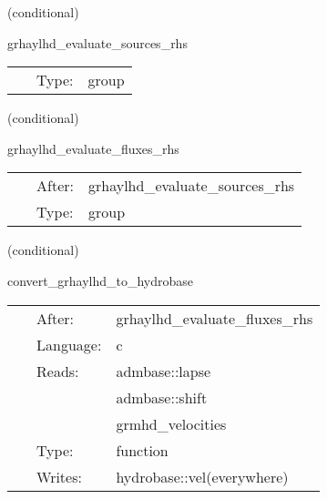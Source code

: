 \documentclass{article}
\begin{document}
\vspace{5mm}

   (conditional) 

\hspace{5mm} grhaylhd\_evaluate\_sources\_rhs 

\hspace{5mm}{\it evaluate source terms in grhd rhss } 


\hspace{5mm}

 \begin{tabular*}{160mm}{cll} 
~ & Type:  & group \\ 
\end{tabular*} 


\vspace{5mm}

   (conditional) 

\hspace{5mm} grhaylhd\_evaluate\_fluxes\_rhs 

\hspace{5mm}{\it evaluate flux terms in grhd rhss } 


\hspace{5mm}

 \begin{tabular*}{160mm}{cll} 
~ & After:  & grhaylhd\_evaluate\_sources\_rhs \\ 
~ & Type:  & group \\ 
\end{tabular*} 


\vspace{5mm}

   (conditional) 

\hspace{5mm} convert\_grhaylhd\_to\_hydrobase 

\hspace{5mm}{\it convert needed hydrobase variables for nrpyleakage } 


\hspace{5mm}

 \begin{tabular*}{160mm}{cll} 
~ & After:  & grhaylhd\_evaluate\_fluxes\_rhs \\ 
~ & Language:  & c \\ 
~ & Reads:  & admbase::lapse \\ 
~& ~ &admbase::shift\\ 
~& ~ &grmhd\_velocities\\ 
~ & Type:  & function \\ 
~ & Writes:  & hydrobase::vel(everywhere) \\ 
\end{tabular*} 
\end{document}
